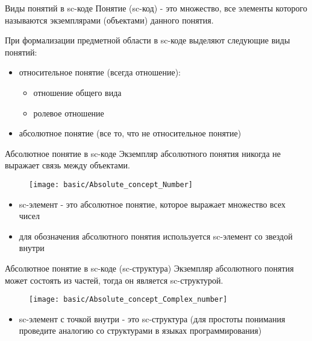 \begin{frame}{Виды понятий в sc-коде}
  Понятие (sc-код) - это множество, все элементы которого называются
  экземплярами (объектами) данного понятия.


  При формализации предметной области в sc-коде выделяют следующие
  виды понятий:
  \begin{itemize}
  \item относительное понятие (всегда отношение):
    \begin{itemize}
    \item отношение общего вида
    \item ролевое отношение
    \end{itemize}
  \item абсолютное понятие (все то, что не относительное понятие)
  \end{itemize}
\end{frame}

\begin{frame}{Абсолютное понятие в sc-коде}
  Экземпляр абсолютного понятия никогда не выражает связь между объектами.
  
  \begin{center}
    \begin{figure}
      \texttt{[image: basic/Absolute\_concept\_Number]}
    \end{figure}
  \end{center}

  \begin{itemize}
  \item sc-элемент  - это абсолютное понятие, которое
    выражает множество всех чисел
  \item для обозначения абсолютного понятия используется sc-элемент со
    звездой внутри
  \end{itemize}
\end{frame}

\begin{frame}{Абсолютное понятие в sc-коде (sc-структура)}
  Экземпляр абсолютного понятия может состоять из частей, тогда он
  является sc-структурой.
  
  \begin{center}
    \begin{figure}
      \texttt{[image: basic/Absolute\_concept\_Complex\_number]}
    \end{figure}
  \end{center}

  \begin{itemize}
  \item sc-элемент с точкой внутри - это sc-структура (для простоты
    понимания проведите аналогию со структурами в языках
    программирования)
  \end{itemize}
\end{frame}

